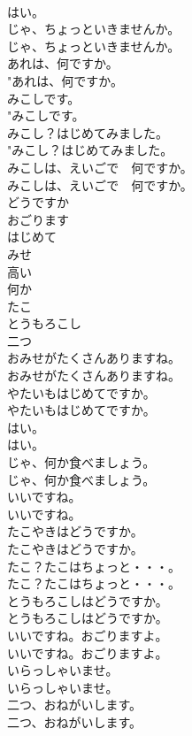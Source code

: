 \documentclass[8pt]{extreport}
\begin{document}
\begin{CJK}{UTF8}{min}
\\	はい。 
\\	じゃ、ちょっといきませんか。	
\\	じゃ、ちょっといきませんか。 
\\	あれは、何ですか。	
\\	"あれは、何ですか。 
\\	みこしです。	
\\	"みこしです。 
\\	みこし？はじめてみました。	
\\	"みこし？はじめてみました。 
\\	みこしは、えいごで　何ですか。	
\\	みこしは、えいごで　何ですか。 
\\	どうですか
\\	おごります
\\	はじめて
\\	みせ
\\	高い
\\	何か
\\	たこ
\\	とうもろこし
\\	二つ
\\	おみせがたくさんありますね。	
\\	おみせがたくさんありますね。 
\\	やたいもはじめてですか。	
\\	やたいもはじめてですか。 
\\	はい。	
\\	はい。 
\\	じゃ、何か食べましょう。	
\\	じゃ、何か食べましょう。 
\\	いいですね。	
\\	いいですね。 
\\	たこやきはどうですか。	
\\	たこやきはどうですか。 
\\	たこ？たこはちょっと・・・。	
\\	たこ？たこはちょっと・・・。 
\\	とうもろこしはどうですか。	
\\	とうもろこしはどうですか。 
\\	いいですね。おごりますよ。	
\\	いいですね。おごりますよ。 
\\	いらっしゃいませ。	
\\	いらっしゃいませ。 
\\	二つ、おねがいします。	
\\	二つ、おねがいします。 

\end{CJK}
\end{document}
